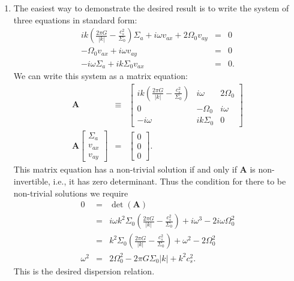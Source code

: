 \begin{enumerate}
\begin{enumerate}
\item The easiest way to demonstrate the desired result is to write the system of three equations in standard form:
\begin{eqnarray*}
i k \left(\frac{2\pi G}{|k|}-\frac{c_s^2}{\Sigma_0}\right) \Sigma_a + i\omega v_{ax} + 2\Omega_0 v_{ay} & = & 0 \\
-\Omega_0 v_{ax} + i \omega v_{ay} & = & 0 \\
-i\omega \Sigma_a  + i k \Sigma_0 v_{ax} & = & 0.
\end{eqnarray*}
We can write this system as a matrix equation:
\begin{eqnarray*}
\mathbf{A} & \equiv & \left[
\begin{array}{ccc}
i k \left(\frac{2\pi G}{|k|}-\frac{c_s^2}{\Sigma_0}\right) &
i\omega &
2\Omega_0 \\
0 & -\Omega_0 & i\omega \\
-i\omega & i k \Sigma_0 & 0
\end{array}
\right] \\
\mathbf{A}
\left[
\begin{array}{c}
\Sigma_a \\
v_{ax} \\
v_{ay} 
\end{array}
\right]
& = & \left[
\begin{array}{c}
0 \\
0 \\
0 
\end{array}
\right].
\end{eqnarray*}
This matrix equation has a non-trivial solution if and only if $\mathbf{A}$ is non-invertible, i.e., it has zero determinant. Thus the condition for there to be non-trivial solutions we require
\begin{eqnarray*}
0 & = & \det(\mathbf{A}) \\
& = &
i \omega k^2 \Sigma_0 \left(\frac{2\pi G}{|k|} - \frac{c_s^2}{\Sigma_0}\right) + i \omega^3 - 2 i \omega \Omega_0^2 \\
& = & k^2 \Sigma_0 \left(\frac{2\pi G}{|k|} - \frac{c_s^2}{\Sigma_0}\right) + \omega^2 - 2\Omega_0^2 \\
\omega^2 & = & 2\Omega_0^2 - 2 \pi G\Sigma_0 |k| + k^2 c_s^2.
\end{eqnarray*}
This is the desired dispersion relation.


\end{enumerate}
\end{enumerate}
